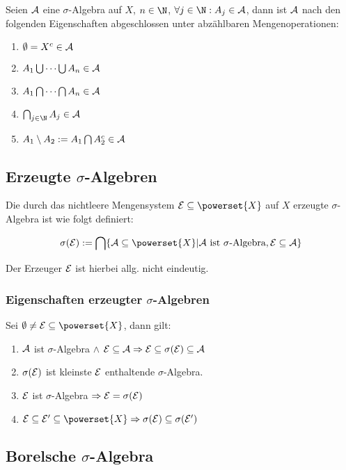 Seien $\mathcal{A}$ eine $\sigma$-Algebra auf $X$, $n \in \N$, $\forall j \in \N : A_j \in \A$, dann ist $\mathcal{A}$ nach den folgenden Eigenschaften abgeschlossen unter abzählbaren Mengenoperationen:

\begin{enumerate}[label=(\alph*)]
	\item $\emptyset = X^c \in \mathcal{A}$
	\item $A_1 \bigcup \cdots \bigcup A_n \in \mathcal{A}$
	\item $A_1 \bigcap \cdots \bigcap A_n \in \mathcal{A}$
	\item $\bigcap_{j\in \N} A_j \in \A$
	\item $A_1 \setminus A_2 := A_1 \bigcap A_2^c \in \mathcal{A}$
\end{enumerate}

\subsection*{Erzeugte $\sigma$-Algebren}

Die durch das nichtleere Mengensystem $\E \subseteq \powerset{X}$ auf $X$ erzeugte $\sigma$-Algebra ist wie folgt definiert:

\vspace*{-4mm}
$$\sigma(\E) := \bigcap\{ \A \subseteq \powerset{X} | \A \text{ ist } \sigma \text{-Algebra}, \E \subseteq \A \}$$

Der Erzeuger $\mathcal{E}$ ist hierbei allg. nicht eindeutig.

\subsubsection*{Eigenschaften erzeugter $\sigma$-Algebren}

Sei $\emptyset \neq \E \subseteq \powerset{X}$, dann gilt:

\begin{enumerate}[label=(\alph*)]
	\item $\mathcal{A}$ ist $\sigma$-Algebra $\land$ $\mathcal{E} \subseteq \mathcal{A} \Rightarrow \mathcal{E} \subseteq \sigma(\mathcal{E}) \subseteq \mathcal{A}$
	\item $\sigma(\mathcal{E})$ ist kleinste $\mathcal{E}$ enthaltende $\sigma$-Algebra.
	\item $\mathcal{E}$ ist $\sigma$-Algebra $\Rightarrow \mathcal{E} = \sigma(\mathcal{E})$
	\item $\E \subseteq \E' \subseteq \powerset{X} \Rightarrow \sigma(\E) \subseteq \sigma(\E')$
\end{enumerate}

\subsection*{Borelsche $\sigma$-Algebra}


